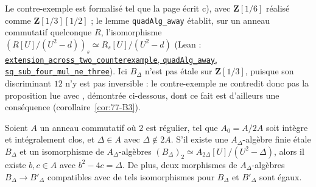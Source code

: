 Le contre-exemple est formalisé tel que la page écrit c), avec $\mathbf Z[1/6]$ réalisé comme $\mathbf Z[1/3][1/2]$ ; le lemme \texttt{quadAlg\_away} établit, sur un anneau commutatif quelconque $R$, l'isomorphisme $(R[U]/(U^2 - d))_s \simeq R_s[U]/(U^2 - d)$ (Lean : \href{\leanblob/RingTheory/Folder77.lean}{\texttt{extension\_across\_two\_counterexample}, \texttt{quadAlg\_away}, \texttt{sq\_sub\_four\_mul\_ne\_three}}). Ici $B_\Delta$ n'est pas étale sur $\mathbf Z[1/3]$, puisque son discriminant $12$ n'y est pas inversible : le contre-exemple ne contredit donc pas la proposition lue avec , démontrée ci-dessous, dont ce fait est d'ailleurs une conséquence (corollaire~\ref{cor:77-B3}).

\begin{encadre}
\begin{theoreme}\label{thm:77-p85}
Soient $A$ un anneau commutatif où $2$ est régulier, tel que $A_0 = A/2A$ soit intègre et intégralement clos, et $\Delta \in A$ avec $\Delta \notin 2A$. S'il existe une $A_\Delta$-algèbre finie étale $B_\Delta$ et un isomorphisme de $A_\Delta$-algèbres $(B_\Delta)_2 \simeq A_{2\Delta}[U]/(U^2 - \Delta)$, alors il existe $b, c \in A$ avec $b^2 - 4c = \Delta$. De plus, deux morphismes de $A_\Delta$-algèbres $B_\Delta \to B'_\Delta$ compatibles avec de tels isomorphismes pour $B_\Delta$ et $B'_\Delta$ sont égaux.
\end{theoreme}
\end{encadre}


